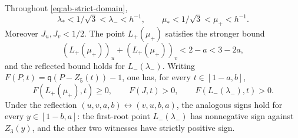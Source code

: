 \begin{lemma}
\label{lem:fixed-line-signs}
Throughout \eqref{eq:ab-strict-domain},
\begin{equation}
 \lambda_*<1/\sqrt3<\lambda_-<h^{-1},\qquad
 \mu_*<1/\sqrt3<\mu_+<h^{-1}.
 \label{eq:first-root-order}
\end{equation}
Moreover $J_u,J_v<1/2$. The point $L_+(\mu_+)$ satisfies the stronger bound
\[
 (L_+(\mu_+))_u+(L_+(\mu_+))_v<2-a<3-2a,
\]
and the reflected bound holds for $L_-(\lambda_-)$. Writing
$F(P,t)=\mathsf q(P-Z_5(t))-1$, one has, for every $t\in[1-a,b]$,
\begin{equation}
 F(L_+(\mu_+),t)\ge0,\qquad F(J,t)>0,\qquad
 F(L_-(\lambda_-),t)>0.
 \label{eq:moving-right-signs}
\end{equation}
Under the reflection $(u,v,a,b)\leftrightarrow(v,u,b,a)$,
the analogous signs hold for every $y\in[1-b,a]$: the first-root point
$L_-(\lambda_-)$ has nonnegative sign against $Z_3(y)$, and the other
two witnesses have strictly positive sign.
\end{lemma}

